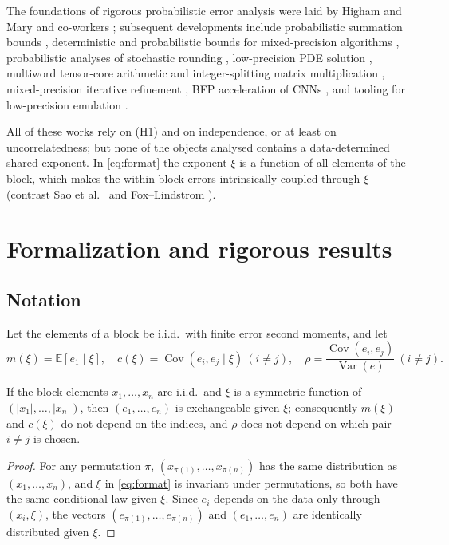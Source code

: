\documentclass[review,hidelinks,oneeqnum,onetabnum,onefignum,onethmnum]{siamart251216}
\begin{document}
The foundations of rigorous probabilistic error analysis were laid by Higham
and Mary and co-workers \cite{higham2019}; subsequent developments include
probabilistic summation bounds \cite{hallman2023}, deterministic and
probabilistic bounds for mixed-precision algorithms
\cite{bhola2024a,bhola2024b}, probabilistic analyses of stochastic rounding
\cite{elarar2024,drineas2024,elarar2026}, low-precision PDE solution
\cite{croci2022}, multiword tensor-core arithmetic and integer-splitting matrix
multiplication \cite{fasi2023,abdelfattah2025}, mixed-precision iterative
refinement \cite{carson2024}, BFP acceleration of CNNs \cite{fan2018}, and
tooling for low-precision emulation \cite{carson2025}.

All of these works rely on (H1) and on independence, or at least on
uncorrelatedness; but none of the objects analysed contains a data-determined
shared exponent. In \cref{eq:format} the exponent $\xi$ is a function of all
elements of the block, which makes the within-block errors intrinsically
coupled through $\xi$ (contrast Sao et al.\ \cite{sao2026trees} and
Fox--Lindstrom \cite{fox2024zfp}).

\section{Formalization and rigorous results}
\label{sec:formal}

\subsection{Notation}

Let the elements of a block be i.i.d.\ with finite error second moments, and let
\begin{equation}
m(\xi)=\mathbb{E}[e_1\mid\xi],\quad
c(\xi)=\operatorname{Cov}(e_i,e_j\mid\xi)\ (i\ne j),\quad
\rho=\frac{\operatorname{Cov}(e_i,e_j)}{\operatorname{Var}(e)}\ (i\ne j).
\label{eq:notation}
\end{equation}

\begin{lemma}
\label{lem:exch}
If the block elements $x_1,\dots,x_n$ are i.i.d.\ and $\xi$ is a symmetric
function of $(|x_1|,\dots,|x_n|)$, then $(e_1,\dots,e_n)$ is exchangeable given
$\xi$; consequently $m(\xi)$ and $c(\xi)$ do not depend on the indices, and
$\rho$ does not depend on which pair $i\ne j$ is chosen.
\end{lemma}

\begin{proof}
For any permutation $\pi$, $(x_{\pi(1)},\dots,x_{\pi(n)})$ has the same
distribution as $(x_1,\dots,x_n)$, and $\xi$ in \cref{eq:format} is invariant
under permutations, so both have the same conditional law given $\xi$. Since
$e_i$ depends on the data only through $(x_i,\xi)$, the vectors
$(e_{\pi(1)},\dots,e_{\pi(n)})$ and $(e_1,\dots,e_n)$ are identically distributed
given $\xi$.
\end{proof}
\end{document}
